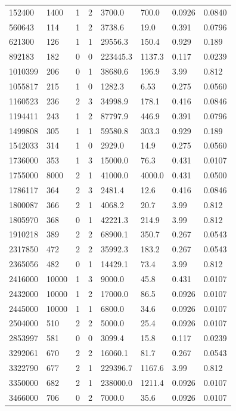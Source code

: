 \documentclass[preview]{standalone}
\begin{document}
{{\begin{tabular}{L{1.2cm}C{1.2cm} C{0.3cm}C{0.5cm} C{1.4cm}C{1.4cm} C{1.4cm}C{1.4cm}}
  152400  &  1400  & 1     &  2 &  3700.0  & 700.0  & 0.0926 &  0.0840   \\ 
  560643  &   114  & 1     &  2 &  3738.6  & 19.0  & 0.391 &  0.0796   \\ 
  621300  &   126  & 1     &  1 &  29556.3  & 150.4  & 0.929 &  0.189   \\ 
  892183  &   182  & 0     &  0 &  223445.3  & 1137.3  & 0.117 &  0.0239   \\ 
  1010399  &   206  & 0     &  1 &  38680.6  & 196.9  & 3.99 &  0.812   \\ 
  1055817  &   215  & 1     &  0 &  1282.3  & 6.53  & 0.275 &  0.0560   \\ 
  1160523  &   236  & 2     &  3 &  34998.9  & 178.1  & 0.416 &  0.0846   \\ 
  1194411  &   243  & 1     &  2 &  87797.9  & 446.9  & 0.391 &  0.0796   \\ 
  1499808  &   305  & 1     &  1 &  59580.8  & 303.3  & 0.929 &  0.189   \\ 
  1542033  &   314  & 1     &  0 &  2929.0  & 14.9  & 0.275 &  0.0560   \\ 
  1736000  &   353  & 1     &  3 &  15000.0  & 76.3  & 0.431 &  0.0107   \\ 
  1755000  &  8000  & 2     &  1 &  41000.0  & 4000.0  & 0.431 &  0.0500   \\ 
  1786117  &   364  & 2     &  3 &  2481.4  & 12.6  & 0.416 &  0.0846   \\ 
  1800087  &   366  & 2     &  1 &  4068.2  & 20.7  & 3.99 &  0.812   \\ 
  1805970  &   368  & 0     &  1 &  42221.3  & 214.9  & 3.99 &  0.812   \\ 
  1910218  &   389  & 2     &  2 &  68900.1  & 350.7  & 0.267 &  0.0543   \\ 
  2317850  &   472  & 2     &  2 &  35992.3  & 183.2  & 0.267 &  0.0543   \\ 
  2365056  &   482  & 0     &  1 &  14429.1  & 73.4  & 3.99 &  0.812   \\ 
  2416000  &  10000  & 1     &  3 &  9000.0  & 45.8  & 0.431 &  0.0107   \\ 
  2432000  &  10000  & 1     &  2 &  17000.0  & 86.5  & 0.0926 &  0.0107   \\ 
  2445000  &  10000  & 1     &  1 &  6800.0  & 34.6  & 0.0926 &  0.0107   \\ 
  2504000  &   510  & 2     &  2 &  5000.0  & 25.4  & 0.0926 &  0.0107   \\ 
  2853997  &   581  & 0     &  0 &  3099.4  & 15.8  & 0.117 &  0.0239   \\ 
  3292061  &   670  & 2     &  2 &  16060.1  & 81.7  & 0.267 &  0.0543   \\ 
  3322790  &   677  & 2     &  1 &  229396.7  & 1167.6  & 3.99 &  0.812   \\ 
  3350000  &   682  & 2     &  1 &  238000.0  & 1211.4  & 0.0926 &  0.0107   \\ 
  3466000  &   706  & 0     &  2 &  7000.0  & 35.6  & 0.0926 &  0.0107   \\ 
\hline 
\end{tabular} 

}}
\end{document}
